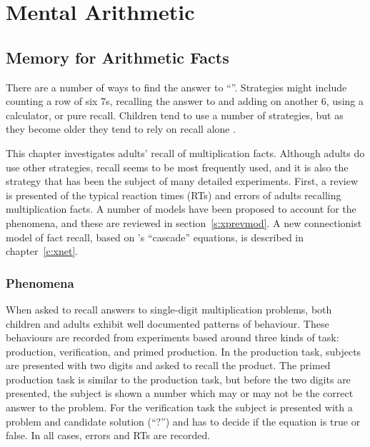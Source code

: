 

\part[Mental arithmetic]{Mental Arithmetic}\label{c:mental}

\chapter[Memory for arithmetic facts]{Memory for Arithmetic
Facts}\label{c:xlit}

There are a number of ways to find the answer to ``''.  Strategies
might include counting a row of six 7s, recalling the answer to  and
adding on another 6, using a calculator, or pure recall. Children tend to
use a number of strategies, but as they become older they tend
to rely on recall alone \cite{siegmult}.

This chapter investigates adults' recall of multiplication facts.
Although adults do use other strategies, recall seems to be most frequently
used, and it is also the strategy that has been the subject of many
detailed experiments. First, a review is presented of the typical reaction
times (RTs) and errors of adults recalling multiplication facts.  A number
of models have been proposed to account for the phenomena, and these are
reviewed in section~\ref{s:xprevmod}.  A new connectionist model of fact
recall, based on \citeauthor{mccascade}'s \citeyear{mccascade,pdp3}
``cascade''
equations, is described in chapter~\ref{c:xnet}.



\section{Phenomena}

When asked to recall answers to single-digit multiplication problems, both
children and adults exhibit well documented patterns of behaviour. These
behaviours are recorded from experiments based around three kinds of task:
production, verification, and primed production.  In the production task,
subjects are presented with two digits and asked to recall the product.
The primed production task is similar to the production task, but before
the two digits are presented, the subject is shown a number which may or
may not be the correct answer to the problem.  For the verification task
the subject is presented with a problem and candidate solution
(``?'') and
has to
decide if the equation is true or false.
In all cases, errors and RTs are recorded.

